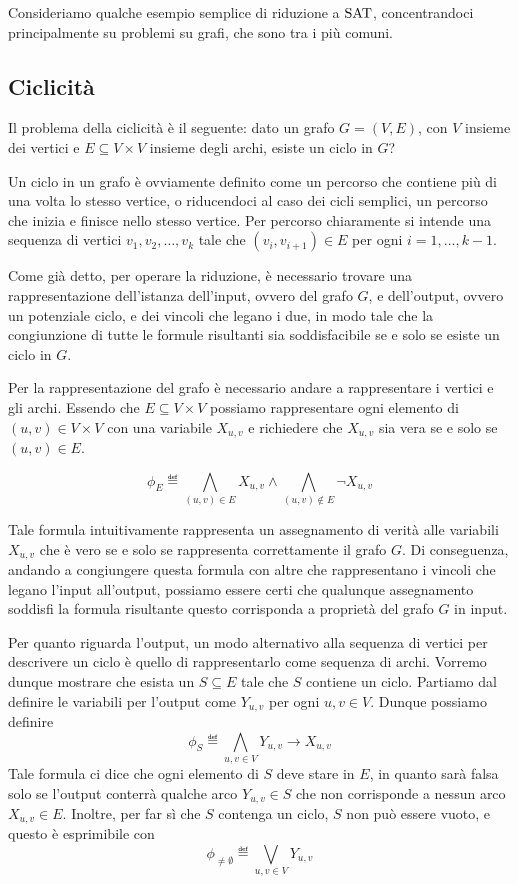 Consideriamo qualche esempio semplice di riduzione a \(\Sat\), concentrandoci principalmente su problemi su grafi, che sono tra i più comuni.

\subsection{Ciclicità}
Il problema della ciclicità è il seguente: dato un grafo \(G=(V,E)\), con \(V\) insieme dei vertici e \(E\subseteq V\times V\) insieme degli archi, esiste un ciclo in \(G\)?

Un ciclo in un grafo è ovviamente definito come un percorso che contiene più di una volta lo stesso vertice, o riducendoci al caso dei cicli semplici, un percorso che inizia e finisce nello stesso vertice. Per percorso chiaramente si intende una sequenza di vertici \(v_1,v_2,\dots,v_k\) tale che \((v_i,v_{i+1})\in E\) per ogni \(i=1,\dots,k-1\).

Come già detto, per operare la riduzione, è necessario trovare una rappresentazione dell'istanza dell'input, ovvero del grafo \(G\), e dell'output, ovvero un potenziale ciclo, e dei vincoli che legano i due, in modo tale che la congiunzione di tutte le formule risultanti sia soddisfacibile se e solo se esiste un ciclo in \(G\).

Per la rappresentazione del grafo è necessario andare a rappresentare i vertici e gli archi. Essendo che \(E\subseteq V\times V\) possiamo rappresentare ogni elemento di \((u,v)\in V\times V\) con una variabile \(X_{u,v}\) e richiedere che \(X_{u,v}\) sia vera se e solo se \((u,v)\in E\).

\[\phi_E \eqdef \bigwedge_{(u,v)\in E} X_{u,v} \land \bigwedge_{(u,v)\notin E} \neg X_{u,v}\]

Tale formula intuitivamente rappresenta un assegnamento di verità alle variabili \(X_{u,v}\) che è vero se e solo se rappresenta correttamente il grafo \(G\). Di conseguenza, andando a congiungere questa formula con altre che rappresentano i vincoli che legano l'input all'output, possiamo essere certi che qualunque assegnamento soddisfi la formula risultante questo corrisponda a proprietà del grafo \(G\) in input.

Per quanto riguarda l'output, un modo alternativo alla sequenza di vertici per descrivere un ciclo è quello di rappresentarlo come sequenza di archi. Vorremo dunque mostrare che esista un \(S\subseteq E\) tale che \(S\) contiene un ciclo. Partiamo dal definire le variabili per l'output come \(Y_{u,v}\) per ogni \(u,v \in V\). Dunque possiamo definire 
\[\phi_S \eqdef \bigwedge_{u,v \in V} Y_{u,v}\to X_{u,v}\]
Tale formula ci dice che ogni elemento di \(S\) deve stare in \(E\), in quanto sarà falsa solo se l'output conterrà qualche arco \(Y_{u,v}\in S\) che non corrisponde a nessun arco \(X_{u,v}\in E\). Inoltre, per far sì che \(S\) contenga un ciclo, \(S\) non può essere vuoto, e questo è esprimibile con
\[\phi_{\neq \emptyset} \eqdef \bigvee_{u,v\in V} Y_{u,v} \]

